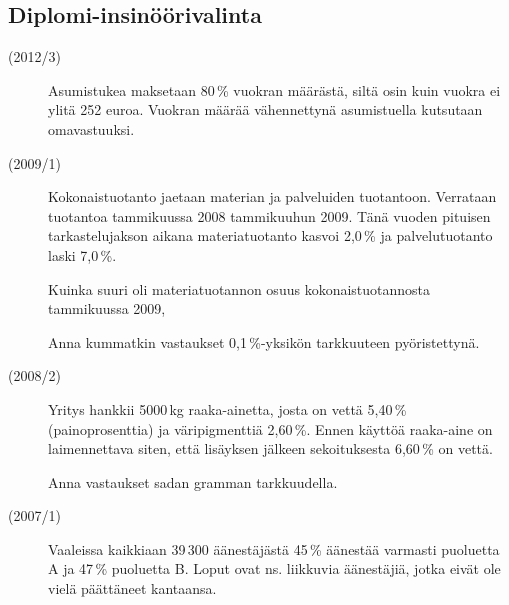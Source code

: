 \subsection*{Diplomi-insinöörivalinta}
\begin{description}
	\item[(2012/3)] Asumistukea maksetaan 80\,\% vuokran määrästä, siltä osin kuin
        vuokra ei ylitä 252 euroa. Vuokran määrää vähennettynä asumistuella
        kutsutaan omavastuuksi.
        
	
	\item[(2009/1)] Kokonaistuotanto jaetaan materian ja palveluiden tuotantoon.
        Verrataan tuotantoa tammikuussa 2008 tammikuuhun 2009. Tänä vuoden pituisen
        tarkastelujakson aikana materiatuotanto kasvoi 2,0\,\% ja palvelutuotanto laski 7,0\,\%.
	
	   Kuinka suuri oli materiatuotannon osuus kokonaistuotannosta tammikuussa 2009,
	   
    	
	   Anna kummatkin vastaukset 0,1\,\%-yksikön tarkkuuteen pyöristettynä.

	\item[(2008/2)] Yritys hankkii 5000\,kg raaka-ainetta, josta on vettä 5,40\,\%
        (painoprosenttia) ja väripigmenttiä 2,60\,\%. Ennen käyttöä raaka-aine on
        laimennettava siten, että lisäyksen jälkeen sekoituksesta 6,60\,\% on vettä.
	
    	
    	Anna vastaukset sadan gramman tarkkuudella.

	\item[(2007/1)] Vaaleissa kaikkiaan 39\,300 äänestäjästä 45\,\% äänestää varmasti
        puoluetta A ja 47\,\% puoluetta B. Loput ovat ns. liikkuvia äänestäjiä,
        jotka eivät ole vielä päättäneet kantaansa.
	
	
\end{description}

